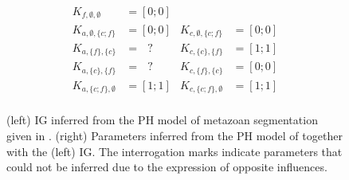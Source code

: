 \begin{figure}[p]
\begin{minipage}{0.4\linewidth}
\centering
{}
\end{minipage}
\begin{minipage}{0.6\linewidth}
\centering
\begin{align*}
K_{f, \emptyset, \emptyset} & =  [0;0] \\
K_{a, \emptyset, \{c;f\}} & =  [0;0] & K_{c, \emptyset, \{c;f\}} & =  [0;0] \\
K_{a, \{f\}, \{c\}} & = \ \ \ ? & K_{c, \{c\}, \{f\}} & =  [1;1] \\
K_{a, \{c\}, \{f\}} & = \ \ \ ? & K_{c, \{f\}, \{c\}} & =  [0;0] \\
K_{a, \{c;f\}, \emptyset} & =  [1;1] & K_{c, \{c;f\}, \emptyset} & =  [1;1] \\
\end{align*}
\end{minipage}
\caption{\label{fig:metazoan-BRN}
(left)
IG inferred from the PH model of metazoan segmentation given in .
(right)
Parameters inferred from the PH model of  together with the (left) IG.
The interrogation marks indicate parameters that could not be inferred due to the expression of opposite influences.
}
\end{figure}
